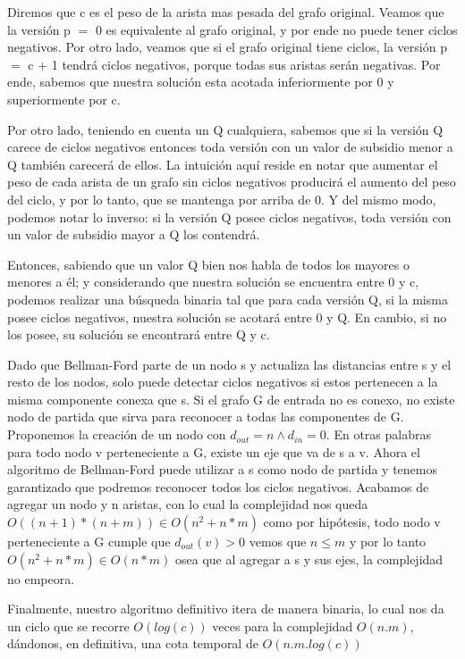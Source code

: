 Diremos que c es el peso de la arista mas pesada del grafo original. Veamos que la versión p $=$ 0 es equivalente al grafo original, y por ende no puede tener ciclos negativos. Por otro lado, veamos que si el grafo original tiene ciclos, la versión p $=$ c + 1 tendrá ciclos negativos, porque todas sus aristas serán negativas. Por ende, sabemos que nuestra solución esta acotada inferiormente por 0 y superiormente por c.

Por otro lado, teniendo en cuenta un Q cualquiera, sabemos que si la versión Q carece de ciclos negativos entonces toda versión con un valor de subsidio menor a Q también carecerá de ellos. La intuición aquí reside en notar que aumentar el peso de cada arista de un grafo sin ciclos negativos producirá el aumento del peso del ciclo, y por lo tanto, que se mantenga por arriba de 0. Y del mismo modo, podemos notar lo inverso: si la versión Q posee ciclos negativos, toda versión con un valor de subsidio mayor a Q los contendrá.

Entonces, sabiendo que un valor Q bien nos habla de todos los mayores o menores a él; y considerando que nuestra solución se encuentra entre 0 y c, podemos realizar una búsqueda binaria tal que para cada versión Q, si la misma posee ciclos negativos, nuestra solución se acotará entre 0 y Q. En cambio, si no los posee, su solución se encontrará entre Q y c.

Dado que Bellman-Ford parte de un nodo s y actualiza las distancias entre s y el resto de los nodos, solo puede detectar ciclos negativos si estos pertenecen a la misma componente conexa que s. Si el grafo G de entrada no es conexo, no existe nodo de partida que sirva para reconocer a todas las componentes de G. Proponemos la creación de un nodo con $d_{out} = n \land d_{in} = 0$. En otras palabras para todo nodo v perteneciente a G, existe un eje que va de s a v. Ahora el algoritmo de Bellman-Ford puede utilizar a s como nodo de partida y tenemos garantizado que podremos reconocer todos los ciclos negativos. Acabamos de agregar un nodo y n aristas, con lo cual la complejidad nos queda $O((n+1)*(n+m)) \in O(n^2+n*m)$ como por hipótesis, todo nodo v perteneciente a G cumple que $d_{out}(v) > 0$ vemos que $n \leq m$ y por lo tanto $O(n^2+n*m) \in O(n*m)$ osea que al agregar a s y sus ejes, la complejidad no empeora.

Finalmente, nuestro algoritmo definitivo itera de manera binaria, lo cual nos da un ciclo que se recorre $O(log(c))$ veces para la complejidad $O(n.m)$, dándonos, en definitiva, una cota temporal de $O(n.m.log(c))$

